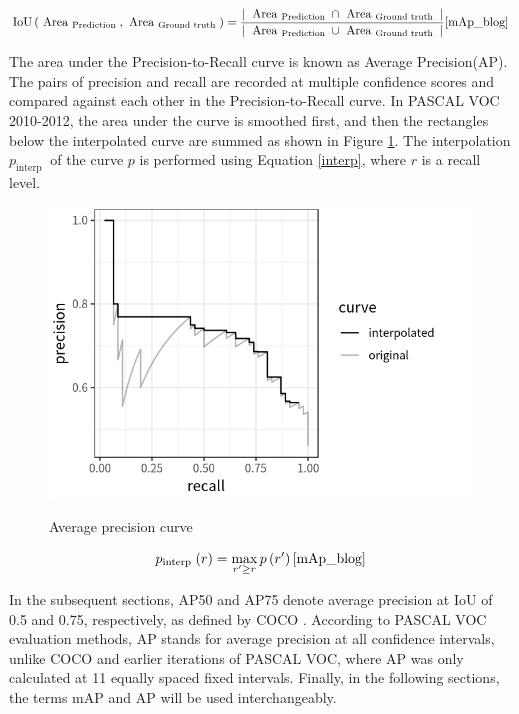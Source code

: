 \documentclass[english, 12pt, a4paper, elec, utf8, a-1b, online]{aaltothesis}
\begin{document}
\begin{equation}
\operatorname{IoU}\left(\text { Area }_{\text {Prediction }}, \text { Area }_{\text {Ground truth }}\right)=\frac{\mid \text { Area }_{\text {Prediction }} \cap \text { Area }_{\text {Ground truth }} \mid}{\mid \text { Area }_{\text {Prediction }} \cup \text { Area }_{\text {Ground truth }} \mid}
\label{iou} 
\cite{mAp_blog} 
\end{equation}

The area under the Precision-to-Recall curve is known as Average Precision(AP). The pairs of precision and recall are recorded at multiple confidence scores and compared against each other in the Precision-to-Recall curve. In PASCAL VOC 2010-2012\cite{Everingham10}, the area under the curve is smoothed first, and then the rectangles below the interpolated curve are summed as shown in Figure \ref{AUC}. The interpolation $p_{\text {interp }}$ of the curve $p$ is performed using Equation \ref{interp}, where $r$ is a recall level. 

\begin{figure}[htb]
	\begin{center}
		\includegraphics[width=12cm]{./AUC.png}
	\end{center}
	\caption{Average precision curve \cite{mAp_blog}}
	\begin{center}
		\label{AUC}
	\end{center}
\end{figure}
\FloatBarrier


\begin{equation}
p_{\text {interp }}(r)=\max _{r^{\prime} \geq r} p\left(r^{\prime}\right)
\label{interp}
\cite{mAp_blog}  
\end{equation}

In the subsequent sections, AP50 and AP75 denote average precision at IoU of 0.5 and 0.75, respectively, as defined by COCO \cite{Lin2014}. According to PASCAL VOC \cite{Everingham10} evaluation methods, AP stands for average precision at all confidence intervals, unlike COCO \cite{Lin2014} and earlier iterations of PASCAL VOC, where AP was only calculated at 11 equally spaced fixed intervals. Finally, in the following sections, the terms mAP and AP will be used interchangeably. 
\end{document}
